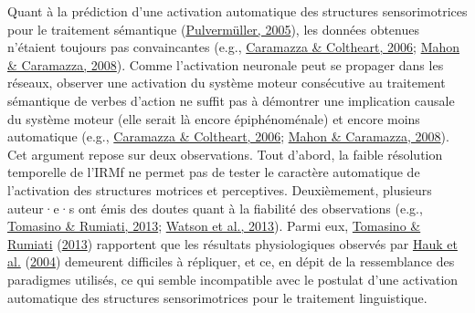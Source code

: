 \documentclass[
  a4paper,12pt,twoside,onecolumn,openright,final,oldfontcommands]{memoir}
\begin{document}
Quant à la prédiction d'une activation automatique des structures sensorimotrices pour le traitement sémantique (\protect\hyperlink{ref-pulvermuller_brain_2005}{Pulvermüller, 2005}), les données obtenues n'étaient toujours pas convaincantes (e.g., \protect\hyperlink{ref-caramazza_cognitive_2006}{Caramazza \& Coltheart, 2006}; \protect\hyperlink{ref-mahon_critical_2008}{Mahon \& Caramazza, 2008}). Comme l'activation neuronale peut se propager dans les réseaux, observer une activation du système moteur consécutive au traitement sémantique de verbes d'action ne suffit pas à démontrer une implication causale du système moteur (elle serait là encore épiphénoménale) et encore moins automatique (e.g., \protect\hyperlink{ref-caramazza_cognitive_2006}{Caramazza \& Coltheart, 2006}; \protect\hyperlink{ref-mahon_critical_2008}{Mahon \& Caramazza, 2008}). Cet argument repose sur deux observations. Tout d'abord, la faible résolution temporelle de l'IRMf ne permet pas de tester le caractère automatique de l'activation des structures motrices et perceptives. Deuxièmement, plusieurs auteur·e·s ont émis des doutes quant à la fiabilité des observations (e.g., \protect\hyperlink{ref-tomasino_at_2013}{Tomasino \& Rumiati, 2013}; \protect\hyperlink{ref-watson_action_2013}{Watson et al., 2013}). Parmi eux, \protect\hyperlink{ref-tomasino_at_2013}{Tomasino \& Rumiati} (\protect\hyperlink{ref-tomasino_at_2013}{2013}) rapportent que les résultats physiologiques observés par \protect\hyperlink{ref-hauk_somatotopic_2004}{Hauk et al.} (\protect\hyperlink{ref-hauk_somatotopic_2004}{2004}) demeurent difficiles à répliquer, et ce, en dépit de la ressemblance des paradigmes utilisés, ce qui semble incompatible avec le postulat d'une activation automatique des structures sensorimotrices pour le traitement linguistique.
\end{document}
